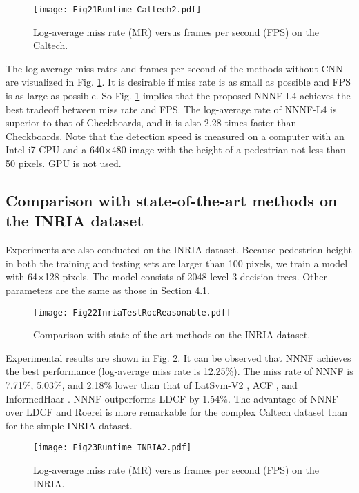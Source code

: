 \documentclass[10pt,twocolumn,letterpaper]{article}
\begin{document}
\begin{figure}[!t]
\centering
\texttt{[image: Fig21Runtime\_Caltech2.pdf]}
\caption{Log-average miss rate (MR) versus frames per second (FPS) on the Caltech.}
\label{FigRunTimeCaltech}
\end{figure}

The log-average miss rates and frames per second of the methods without CNN are visualized in Fig. \ref{FigRunTimeCaltech}. It is 
desirable if miss rate is as small as possible and FPS is as large as 
possible. So Fig. \ref{FigRunTimeCaltech} implies that the proposed NNNF-L4 achieves the best 
tradeoff between miss rate and FPS. The log-average rate of NNNF-L4 is superior to 
that of Checkboards, and it is also 2.28 times faster than Checkboards. Note that the detection speed is 
measured on a computer with an Intel i7 CPU and a 640$\times $480 image 
with the height of a pedestrian not less than 50 pixels. GPU is not used. 

\subsection{Comparison with state-of-the-art methods on the INRIA dataset}
Experiments are also conducted on the INRIA dataset. Because pedestrian 
height in both the training and testing sets are larger than 100 pixels, we 
train a model with 64$\times $128 pixels. The model consists of 2048 level-3 
decision trees. Other parameters are the same as those in Section 4.1. 

\begin{figure}[!t]
\centering
\texttt{[image: Fig22InriaTestRocReasonable.pdf]}
\caption{Comparison with state-of-the-art methods on the INRIA dataset.}
\label{FigINRIA}
\end{figure}


Experimental results are shown in Fig. \ref{FigINRIA}. It can be observed that NNNF achieves the best performance (log-average miss rate is 
12.25{\%}). The miss rate of NNNF is 7.71{\%}, 5.03{\%}, and 2.18{\%}
lower than that of LatSvm-V2 \cite{Felzenszwalb_DPM_CVPR_2008}, ACF \cite{Dollar_ACF_PAMI_2014}, and InformedHaar \cite{Zhang_Info.Haar_CVPR_2014}. NNNF outperforms LDCF 
\cite{Nam_LDCF_NIPS_2014} by 1.54{\%}. The advantage 
of NNNF over LDCF \cite{Nam_LDCF_NIPS_2014} and Roerei \cite{Benenson_SquareChns_CVPR_2013} is more remarkable for the complex Caltech 
dataset than for the simple INRIA dataset. 

\begin{figure}[!t]
\centering
\texttt{[image: Fig23Runtime\_INRIA2.pdf]}
\caption{Log-average miss rate (MR) versus frames per second (FPS) on the INRIA.}
\label{FigRunTimeINRIA}
\end{figure}
\end{document}
